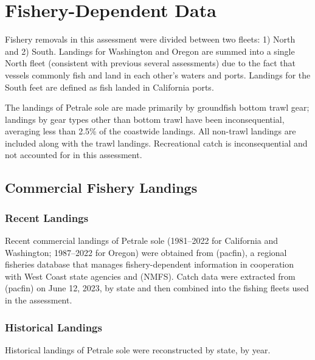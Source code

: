 \documentclass[
]{scrartcl}
\begin{document}
\section{Fishery-Dependent Data}\label{fishery-dependent-data}

Fishery removals in this assessment were divided between two fleets: 1)
North and 2) South. Landings for Washington and Oregon are summed into a
single North fleet (consistent with previous several assessments) due to
the fact that vessels commonly fish and land in each other's waters and
ports. Landings for the South feet are defined as fish landed in
California ports.

The landings of Petrale sole are made primarily by groundfish bottom
trawl gear; landings by gear types other than bottom trawl have been
inconsequential, averaging less than 2.5\% of the coastwide landings.
All non-trawl landings are included along with the trawl landings.
Recreational catch is inconsequential and not accounted for in this
assessment.

\subsection{Commercial Fishery
Landings}\label{commercial-fishery-landings}

\subsubsection{Recent Landings}\label{recent-landings}

Recent commercial landings of Petrale sole (1981--2022 for California
and Washington; 1987--2022 for Oregon) were obtained from (\textsf{pacfin}), a
regional fisheries database that manages fishery-dependent information
in cooperation with West Coast state agencies and (NMFS). Catch data
were extracted from (\textsf{pacfin}) on June 12, 2023, by state and then
combined into the fishing fleets used in the assessment.

\subsubsection{Historical Landings}\label{historical-landings}

Historical landings of Petrale sole were reconstructed by state, by
year.
\end{document}
